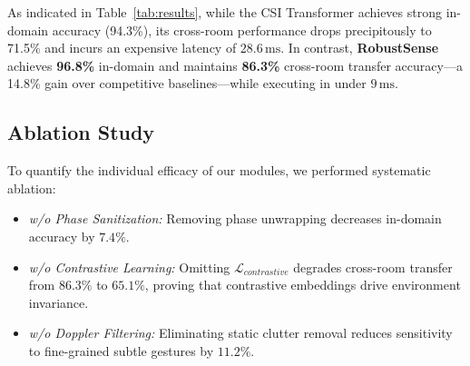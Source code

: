 As indicated in Table~\ref{tab:results}, while the CSI Transformer achieves strong in-domain accuracy (94.3\%), its cross-room performance drops precipitously to 71.5\% and incurs an expensive latency of $28.6\,\text{ms}$. In contrast, \textbf{RobustSense} achieves \textbf{96.8\%} in-domain and maintains \textbf{86.3\%} cross-room transfer accuracy—a 14.8\% gain over competitive baselines—while executing in under $9\,\text{ms}$.

\subsection{Ablation Study}
To quantify the individual efficacy of our modules, we performed systematic ablation:
\begin{itemize}
    \item \textit{w/o Phase Sanitization:} Removing phase unwrapping decreases in-domain accuracy by $7.4\%$.
    \item \textit{w/o Contrastive Learning:} Omitting $\mathcal{L}_{contrastive}$ degrades cross-room transfer from $86.3\%$ to $65.1\%$, proving that contrastive embeddings drive environment invariance.
    \item \textit{w/o Doppler Filtering:} Eliminating static clutter removal reduces sensitivity to fine-grained subtle gestures by $11.2\%$.
\end{itemize}
